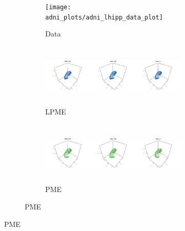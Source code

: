 \documentclass[12pt]{article}
\begin{document}
\begin{figure}

  \begin{subfigure}{\textwidth}
    \label{fig:adni_lhipp_result}
    \begin{subfigure}{\textwidth}
      \centering
      \texttt{[image: adni\_plots/adni\_lhipp\_data\_plot]}
      \caption{Data}
    \end{subfigure}
    \begin{subfigure}{\textwidth}
      \centering
      \includegraphics[height=3cm]{adni_plots/adni_lhipp_lpme_isomap_plot}
      \caption{LPME}
    \end{subfigure}
    \begin{subfigure}{\textwidth}
      \centering
      \includegraphics[height=3cm]{adni_plots/adni_lhipp_pme_plot}
      \caption{PME}
    \end{subfigure}   
  \end{subfigure}


\end{figure}
\end{document}
